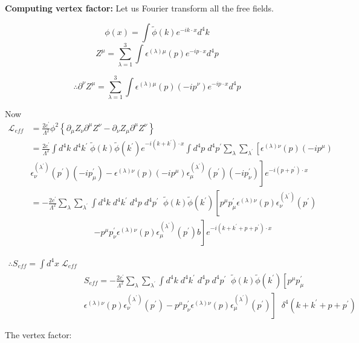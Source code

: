 \documentclass[12pt]{report}
\begin{document}
\textbf{Computing vertex factor:}
 Let us Fourier transform all the free fields.
 
$$\phi(x)= \int \tilde{\phi}(k) e^{-ik\cdot x} d^4k$$
$$Z^\mu = \sum_{\lambda=1}^3 \int\epsilon^{(\lambda) \mu}(p) e^{- ip \cdot x} d^4p $$

$$\therefore \partial^\nu Z^\mu = \sum_{\lambda=1}^3 \int\epsilon^{(\lambda) \mu}(p) (-ip^\nu) e^{-i p \cdot x} d^4p $$

Now 
\begin{align*}
\mathscr{L}_{eff} &= \frac{2c^\prime}{\Lambda^2} \phi^2 \left\{\partial_\mu Z_\nu \partial^\mu Z^\nu - \partial_\nu Z_\mu  \partial^\mu Z^\nu \right\} \\
&=\frac{2c^\prime}{\Lambda^2} \int d^4k \; d^4k^\prime \; \tilde{\phi}(k) \tilde{\phi}(k^\prime) e^{-i(k+k^\prime) \cdot x} \int d^4p \; d^4p^\prime \sum_\lambda \sum_{\lambda^\prime}  \left[\epsilon^{(\lambda)\nu}(p)(-ip^\mu) \right. \\
& \left. \epsilon^{(\lambda^\prime)}_\nu  (p^\prime)(-i p^\prime_\mu) 
  - \epsilon^{(\lambda)\nu}(p)(-ip^\mu) \epsilon^{(\lambda^\prime)}_\mu (p^\prime)(-i p^\prime_\nu)\right] e^{-i (p+ p^\prime) \cdot x}\\
&=- \frac{2c^\prime}{\Lambda^2} \sum_\lambda \sum_{\lambda^\prime} \int d^4k \; d^4k^\prime \; d^4p \; d^4p^\prime \;\; \tilde{\phi}(k) \tilde{\phi}(k^\prime) \left[p^\mu p^\prime_\mu \epsilon^{(\lambda)\nu}(p) \epsilon^{(\lambda^\prime)}_\nu (p^\prime) \right. \\
&\;\;\;\;\;\;\;\;\;\;\;\;\;\;\;\;\;\;\;\;\;\;\;\;\;\;\; \left. - p^\mu p^\prime_\nu \epsilon^{(\lambda)\nu}(p) \epsilon^{(\lambda^\prime)}_\mu (p^\prime)b\right] e^{-i(k+k^\prime+p+p^\prime)\cdot x}
\end{align*}

\begin{align*}
\therefore S_{eff}= \int d^4x \; \mathscr{L}_{eff}\\
& S_{eff}= -\frac{2c^\prime}{\Lambda^2} \sum_\lambda \sum_{\lambda^\prime} \int d^4k \; d^4k^\prime \; d^4p \; d^4p^\prime \;\; \tilde{\phi}(k) \tilde{\phi}(k^\prime) \left[p^\mu p^\prime_\mu \right. \\
& \left. \epsilon^{(\lambda)\nu}(p) \epsilon^{(\lambda^\prime)}_\nu (p^\prime) - p^\mu p^\prime_\nu \epsilon^{(\lambda)\nu}(p) \epsilon^{(\lambda^\prime)}_\mu (p^\prime)\right] \;\; \delta^4(k+k^\prime+p+p^\prime)
\end{align*}

The vertex factor:
\end{document}

